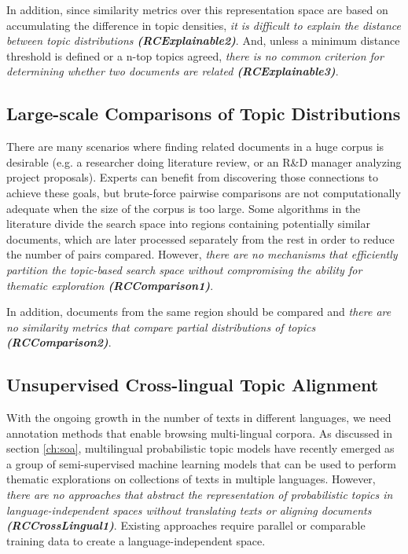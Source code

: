 In addition, since similarity metrics over this representation space are based on accumulating the difference in topic densities, \textit{it is difficult to explain the distance between topic distributions \textbf{(RCExplainable2)}}. And, unless a minimum distance threshold is defined or a n-top topics agreed, \textit{there is no common criterion for determining whether two documents are related \textbf{(RCExplainable3)}}.  


\subsection{Large-scale Comparisons of Topic Distributions}

There are many scenarios where finding related documents in a huge corpus is desirable (e.g. a researcher doing literature review, or an R\&D  manager analyzing project proposals). Experts can benefit from discovering those connections to achieve these goals, but brute-force pairwise comparisons are not computationally adequate when the size of the corpus is too large. Some algorithms in the literature divide the search space into regions containing potentially similar documents, which are later processed separately from the rest in order to reduce the number of pairs compared. However, \textit{there are no mechanisms that efficiently partition the topic-based search space without compromising the ability for thematic exploration \textbf{(RCComparison1)}}.

In addition, documents from the same region should be compared and \textit{there are no similarity metrics that compare partial distributions of topics \textbf{(RCComparison2)}}.


\subsection{Unsupervised Cross-lingual Topic Alignment}

With the ongoing growth in the number of texts in different languages, we need annotation methods that enable browsing multi-lingual corpora. As discussed in section \ref{ch:soa}, multilingual probabilistic topic models have recently emerged as a group of semi-supervised machine learning models that can be used to perform thematic explorations on collections of texts in multiple languages. However, \textit{there are no approaches that abstract the representation of probabilistic topics in language-independent spaces without translating texts or aligning documents \textbf{(RCCrossLingual1)}}. Existing approaches require parallel or comparable training data to create a language-independent space. 

